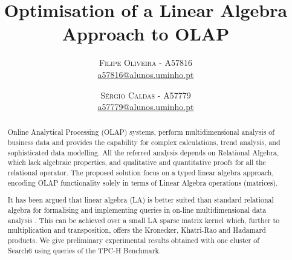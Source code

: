 \documentclass[twoside]{article}
\title{\vspace{-15mm}\fontsize{24pt}{10pt}\selectfont\textbf{Optimisation of a Linear Algebra Approach to OLAP}} %
\author{
\large
\textsc{Filipe Oliveira} - \textsc{A57816}\\
\normalsize \href{mailto:a57816@alunos.uminho.pt}{a57816@alunos.uminho.pt}
\vspace{-5mm}
\and
\textsc{Sérgio Caldas} - \textsc{A57779}\\
\normalsize \href{mailto:a57779@alunos.uminho.pt}{a57779@alunos.uminho.pt}
}
\begin{document}
\maketitle %

\thispagestyle{fancy} %


\begin{abstract}
\indent 
\par Online Analytical Processing (OLAP) systems, perform multidimensional analysis of business data and provides the capability for complex calculations, trend analysis, and sophisticated data modelling. 
All the referred analysis depends on Relational Algebra, which lack algebraic properties, and qualitative and quantitative proofs for all the relational operator.
The proposed solution focus on a typed linear algebra approach, encoding OLAP functionality solely in terms of Linear Algebra operations (matrices).
\par It has been argued that linear algebra (LA) is better suited than standard relational algebra for formalising and implementing queries in on-line multidimensional data analysis \cite{macedo2015linear} \cite{da2015benchmarking}. This can be achieved over a small LA sparse matrix kernel which, further to multiplication and transposition, offers the Kronecker, Khatri-Rao and Hadamard products.
We give preliminary experimental results obtained with one cluster of Search6 using queries of the TPC-H Benchmark.
\end{abstract}
\vspace{0.5cm}

\begin{multicols}{2} %










 





\end{multicols}
\end{document}
